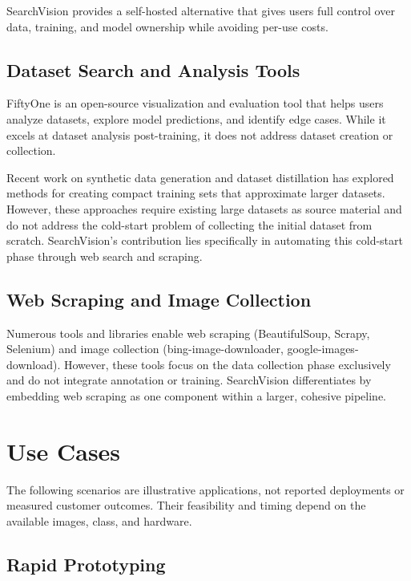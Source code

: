 \documentclass[12pt, letterpaper]{article}
\begin{document}
SearchVision provides a self-hosted alternative that gives users full control over data, training, 
and model ownership while avoiding per-use costs.

\subsection{Dataset Search and Analysis Tools}

FiftyOne \cite{fiftyone} is an open-source visualization and evaluation tool that helps
users analyze datasets, explore model predictions, and identify edge cases. While it excels at 
dataset analysis post-training, it does not address dataset creation or collection.

Recent work on synthetic data generation and dataset distillation has explored methods for
creating compact training sets that approximate larger datasets. However, these approaches
require existing large datasets as source material and do not address the cold-start problem
of collecting the initial dataset from scratch. SearchVision's contribution lies specifically
in automating this cold-start phase through web search and scraping.

\subsection{Web Scraping and Image Collection}

Numerous tools and libraries enable web scraping (BeautifulSoup, Scrapy, Selenium) and image 
collection (bing-image-downloader, google-images-download). However, these tools focus on the 
data collection phase exclusively and do not integrate annotation or training. SearchVision 
differentiates by embedding web scraping as one component within a larger, cohesive pipeline.

\section{Use Cases}

The following scenarios are illustrative applications, not reported deployments or measured
customer outcomes. Their feasibility and timing depend on the available images, class, and hardware.

\subsection{Rapid Prototyping}
\end{document}
